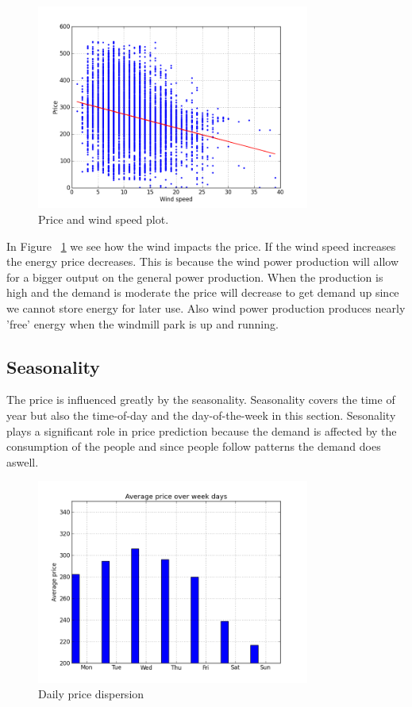 \begin{figure}[H]
\centering
\includegraphics[width=0.8\textwidth ]{billeder/energy_price_plots/price_wind.png}
\caption{Price and wind speed plot.}
\label{fig:price_wind}
\end{figure}

In Figure ~\ref{fig:price_wind} we see how the wind impacts the price. If the wind speed increases the energy price decreases. This is because the wind power production will allow for a bigger output on the general power production. When the production is high and the demand is moderate the price will decrease to get demand up since we cannot store energy for later use. Also wind power production produces nearly 'free' energy when the windmill park is up and running.

\subsection{Seasonality}\label{sec:seasonality}
The price is influenced greatly by the seasonality. Seasonality covers the time of year but also the time-of-day and the day-of-the-week in this section. Sesonality plays a significant role in price prediction because the demand is affected by the consumption of the people and since people follow patterns the demand does aswell.
\begin{figure}[H]
\centering
\includegraphics[width=0.8\textwidth ]{billeder/energy_price_plots/Average_price_over_weekdays.png}
\caption{Daily price dispersion}
\label{fig:price_over_weekdays}
\end{figure}

